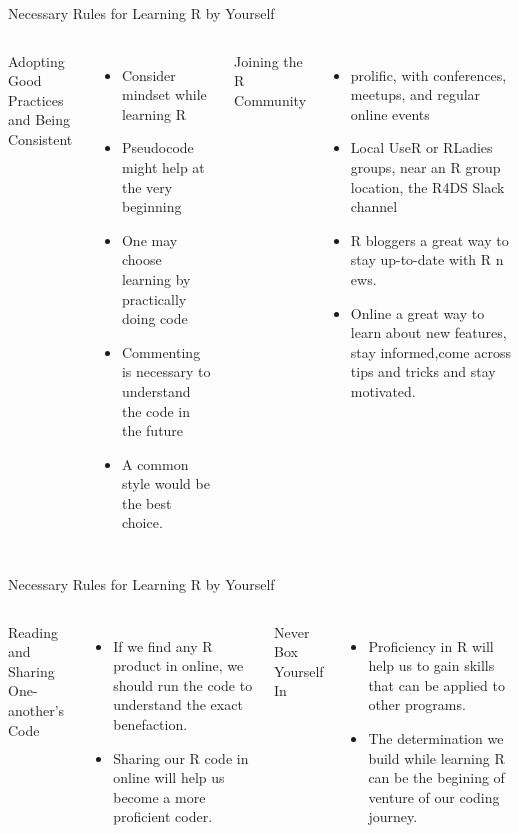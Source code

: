 \documentclass[aspectratio=169]{beamer}
\begin{document}
\begin{frame}{Necessary Rules for Learning R by Yourself}
	\begin{columns}
		 {\color{red!200}Adopting Good Practices and Being Consistent}
		\begin{itemize}
			\item Consider mindset while learning R
			\item Pseudocode might help at the very beginning
			\item One may choose learning by practically doing code
			\item Commenting is necessary to understand the code in the future
			\item A common style would be the best choice.
			
		\end{itemize}
		
		 {\color{red!200}Joining the R Community}
		\begin{itemize}
			\item prolific, with conferences, meetups, and regular online events
			\item   Local UseR or RLadies groups, near an R group location, the R4DS Slack channel
			\item  R bloggers  a great way to stay up-to-date with R n ews.
			\item Online a great way to learn about new features, stay informed,come across tips and tricks and stay motivated.
		\end{itemize}	
		
	\end{columns}		
	
\end{frame}
\begin{frame}{Necessary Rules for Learning R by Yourself}
	\begin{columns}
		 {\color{red!200}Reading and Sharing One-another's Code}
		\begin{itemize}
			\item If we find any R product in online, we should run the code to understand the exact benefaction.
			\item Sharing our R code in online will help us become a more proficient coder.
		\end{itemize}
		
		 {\color{red!200}Never Box Yourself In}
		\begin{itemize}
			\item Proficiency in R will help us to gain skills that can be applied to other programs.
			\item  The determination we build while learning R can be the begining of venture of our coding journey.
		\end{itemize}	
		
	\end{columns}		
	
\end{frame}
\end{document}
